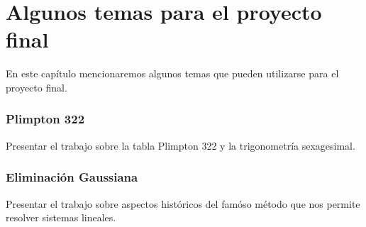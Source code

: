 \chapter{Algunos temas para el proyecto final}

\pagestyle{plain}
\fancyhf{}
\fancyfoot[CE,CO]{\leftmark}
\fancyfoot[LE,RO]{\thepage}


En este capítulo mencionaremos algunos temas
que pueden utilizarse para el proyecto final. 

\subsection*{Plimpton 322}

Presentar el trabajo \cite{MR3716328} sobre la tabla Plimpton 322 y
la trigonometría sexagesimal. 

\subsection*{Eliminación Gaussiana}

Presentar el trabajo \cite{MR2775854} sobre aspectos históricos del famóso 
método que nos permite 
resolver sistemas lineales.